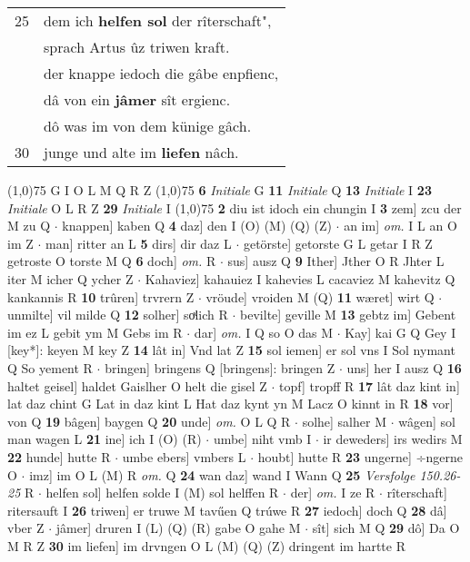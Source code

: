 \documentclass[8pt,a4paper,notitlepage]{article}
\begin{document}
\begin{table}[ht]
\begin{minipage}[t]{0.5\linewidth}
\begin{tabular}{rl}
25 & dem ich \textbf{helfen sol} der rîterschaft",\\ 
 & sprach Artus ûz triwen kraft.\\ 
 & der knappe iedoch die gâbe enpfienc,\\ 
 & dâ von ein \textbf{jâmer} sît ergienc.\\ 
 & dô was im von dem künige gâch.\\ 
30 & junge und alte im \textbf{liefen} nâch.\\ 
\end{tabular}
\scriptsize
\line(1,0){75} \newline
G I O L M Q R Z \newline
\line(1,0){75} \newline
\textbf{6} \textit{Initiale} G  \textbf{11} \textit{Initiale} Q  \textbf{13} \textit{Initiale} I  \textbf{23} \textit{Initiale} O L R Z  \textbf{29} \textit{Initiale} I  \newline
\line(1,0){75} \newline
\textbf{2} diu ist idoch ein chungin I \textbf{3} zem] zcu der M zu Q  $\cdot$ knappen] kaben Q \textbf{4} daz] den I (O) (M) (Q) (Z)  $\cdot$ an im] \textit{om.} I L an O im Z  $\cdot$ man] ritter an L \textbf{5} dirs] dir daz L  $\cdot$ getörste] getorste G L getar I R Z getroste O torste M Q \textbf{6} doch] \textit{om.} R  $\cdot$ sus] ausz Q \textbf{9} Ither] Jther O R Jhter L iter M icher Q ycher Z  $\cdot$ Kahaviez] kahauiez I kahevies L cacaviez M kahevitz Q kankannis R \textbf{10} trûren] trvrern Z  $\cdot$ vröude] vroiden M (Q) \textbf{11} wæret] wirt Q  $\cdot$ unmilte] vil milde Q \textbf{12} solher] soͯlich R  $\cdot$ bevilte] geville M \textbf{13} gebtz im] Gebent im ez L gebit ym M Gebs im R  $\cdot$ dar] \textit{om.} I Q so O das M  $\cdot$ Kay] kai G Q Gey I [key*]: keyen M key Z \textbf{14} lât in] Vnd lat Z \textbf{15} sol iemen] er sol vns I Sol nymant Q So yement R  $\cdot$ bringen] bringens Q [bringens]: bringen Z  $\cdot$ uns] her I ausz Q \textbf{16} haltet geisel] haldet Gaislher O helt die gisel Z  $\cdot$ topf] tropff R \textbf{17} lât daz kint in] lat daz chint G Lat in daz kint L Hat daz kynt yn M Lacz O kinnt in R \textbf{18} vor] von Q \textbf{19} bâgen] baygen Q \textbf{20} unde] \textit{om.} O L Q R  $\cdot$ solhe] salher M  $\cdot$ wâgen] sol man wagen L \textbf{21} ine] ich I (O) (R)  $\cdot$ umbe] niht vmb I  $\cdot$ ir deweders] irs wedirs M \textbf{22} hunde] hutte R  $\cdot$ umbe ebers] vmbers L  $\cdot$ houbt] hutte R \textbf{23} ungerne] ÷ngerne O  $\cdot$ imz] im O L (M) R \textit{om.} Q \textbf{24} wan daz] wand I Wann Q \textbf{25} \textit{Versfolge 150.26-25} R   $\cdot$ helfen sol] helfen solde I (M) sol helffen R  $\cdot$ der] \textit{om.} I ze R  $\cdot$ rîterschaft] ritersauft I \textbf{26} triwen] er truwe M tavűen Q trúwe R \textbf{27} iedoch] doch Q \textbf{28} dâ] vber Z  $\cdot$ jâmer] druren I (L) (Q) (R) gabe O gahe M  $\cdot$ sît] sich M Q \textbf{29} dô] Da O M R Z \textbf{30} im liefen] im drvngen O L (M) (Q) (Z) dringent im hartte R \newline

\end{minipage}
\end{table}
\end{document}
